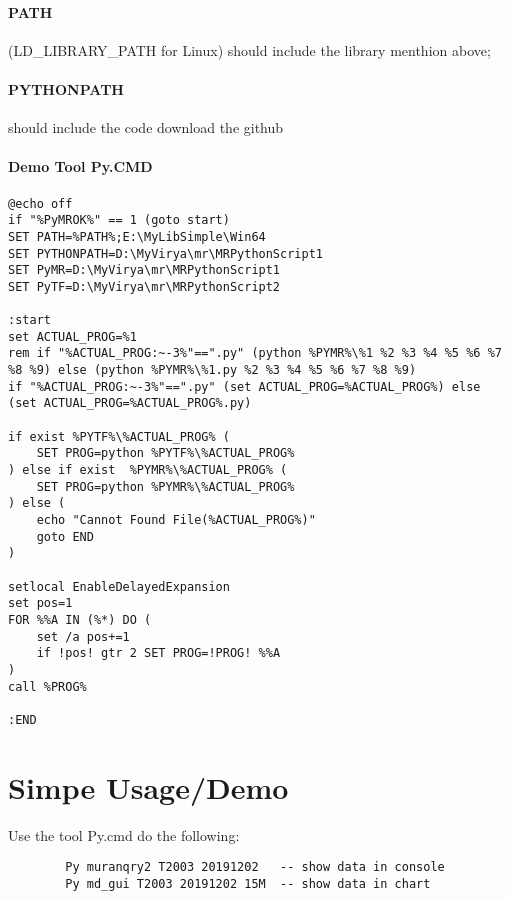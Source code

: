 \documentclass{article}
\begin{document}
	\paragraph
	{PATH}(LD\_LIBRARY\_PATH for Linux) should include the library menthion above; 
	\paragraph
	{PYTHONPATH} should include the code download  the github
	\paragraph{Demo Tool Py.CMD}
	\begin{verbatim}
@echo off
if "%PyMROK%" == 1 (goto start)
SET PATH=%PATH%;E:\MyLibSimple\Win64
SET PYTHONPATH=D:\MyVirya\mr\MRPythonScript1
SET PyMR=D:\MyVirya\mr\MRPythonScript1
SET PyTF=D:\MyVirya\mr\MRPythonScript2

:start
set ACTUAL_PROG=%1
rem if "%ACTUAL_PROG:~-3%"==".py" (python %PYMR%\%1 %2 %3 %4 %5 %6 %7 %8 %9) else (python %PYMR%\%1.py %2 %3 %4 %5 %6 %7 %8 %9)
if "%ACTUAL_PROG:~-3%"==".py" (set ACTUAL_PROG=%ACTUAL_PROG%) else (set ACTUAL_PROG=%ACTUAL_PROG%.py)

if exist %PYTF%\%ACTUAL_PROG% (
	SET PROG=python %PYTF%\%ACTUAL_PROG%
) else if exist  %PYMR%\%ACTUAL_PROG% (
	SET PROG=python %PYMR%\%ACTUAL_PROG% 
) else (
	echo "Cannot Found File(%ACTUAL_PROG%)"
	goto END
)

setlocal EnableDelayedExpansion
set pos=1
FOR %%A IN (%*) DO (
	set /a pos+=1
	if !pos! gtr 2 SET PROG=!PROG! %%A
)
call %PROG%

:END
	\end{verbatim}
\section{Simpe Usage/Demo}
Use the tool Py.cmd do the following:
	\begin{verbatim}
        Py muranqry2 T2003 20191202   -- show data in console
        Py md_gui T2003 20191202 15M  -- show data in chart
	\end{verbatim}
		
\end{document}
